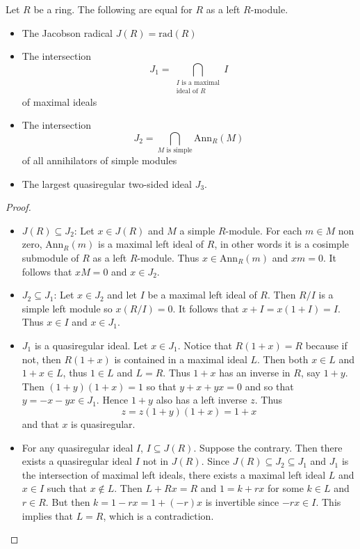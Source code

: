 \documentclass[a4paper]{article}
\begin{document}
\begin{thm}{}{} Let $R$ be a ring. The following are equal for $R$ as a left $R$-module. 
\begin{itemize}
\item The Jacobson radical $J(R)=\text{rad}(R)$
\item The intersection $$J_1=\bigcap_{\substack{I\text{ is a maximal}\\\text{ideal of }R}}I$$ of maximal ideals
\item The intersection $$J_2=\bigcap_{M\text{ is simple}}\text{Ann}_R(M)$$ of all annihilators of simple modules
\item The largest quasiregular two-sided ideal $J_3$. 
\end{itemize} \tcbline
\begin{proof}~\\
\begin{itemize}
\item $J(R)\subseteq J_2$: Let $x\in J(R)$ and $M$ a simple $R$-module. For each $m\in M$ non zero, $\text{Ann}_R(m)$ is a maximal left ideal of $R$, in other words it is a cosimple submodule of $R$ as a left $R$-module. Thus $x\in\text{Ann}_R(m)$ and $xm=0$. It follows that $xM=0$ and $x\in J_2$. 

\item $J_2\subseteq J_1$: Let $x\in J_2$ and let $I$ be a maximal left ideal of $R$. Then $R/I$ is a simple left module so $x(R/I)=0$. It follows that $x+I=x(1+I)=I$. Thus $x\in I$ and $x\in J_1$. 

\item $J_1$ is a quasiregular ideal. Let $x\in J_1$. Notice that $R(1+x)=R$ because if not, then $R(1+x)$ is contained in a maximal ideal $L$. Then both $x\in L$ and $1+x\in L$, thus $1\in L$ and $L=R$. Thus $1+x$ has an inverse in $R$, say $1+y$. Then $(1+y)(1+x)=1$ so that $y+x+yx=0$ and so that $y=-x-yx\in J_1$. Hence $1+y$ also has a left inverse $z$. Thus $$z=z(1+y)(1+x)=1+x$$ and that $x$ is quasiregular. 

\item For any quasiregular ideal $I$, $I\subseteq J(R)$. Suppose the contrary. Then there exists a quasiregular ideal $I$ not in $J(R)$. Since $J(R)\subseteq J_2\subseteq J_1$ and $J_1$ is the intersection of maximal left ideals, there exists a maximal left ideal $L$ and $x\in I$ such that $x\notin L$. Then $L+Rx=R$ and $1=k+rx$ for some $k\in L$ and $r\in R$. But then $k=1-rx=1+(-r)x$ is invertible since $-rx\in I$. This implies that $L=R$, which is a contradiction. 


\end{itemize}
\end{proof}
\end{thm}
\end{document}
